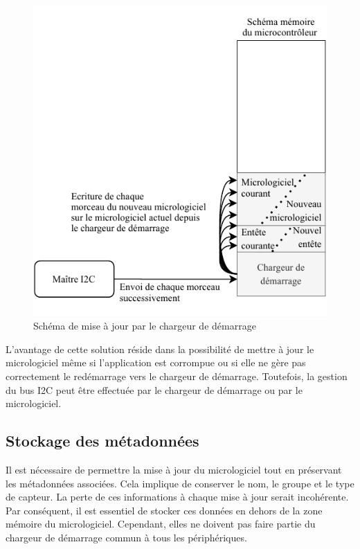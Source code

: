 \begin{figure}[H]
    \centering
    \includegraphics[scale=1.3]{./assets/figures/bootloader_update.pdf}
    \caption{Schéma de mise à jour par le chargeur de démarrage}
\end{figure}

L'avantage de cette solution réside dans la possibilité de mettre à jour le micrologiciel même si l'application est corrompue ou si elle ne gère pas correctement le redémarrage vers le chargeur de démarrage.
Toutefois, la gestion du bus I2C peut être effectuée par le chargeur de démarrage ou par le micrologiciel.

\subsection{Stockage des métadonnées}

Il est nécessaire de permettre la mise à jour du micrologiciel tout en préservant les métadonnées associées.
Cela implique de conserver le nom, le groupe et le type de capteur.
La perte de ces informations à chaque mise à jour serait incohérente.
Par conséquent, il est essentiel de stocker ces données en dehors de la zone mémoire du micrologiciel.
Cependant, elles ne doivent pas faire partie du chargeur de démarrage commun à tous les périphériques.

